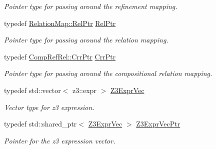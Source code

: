 \begin{DoxyCompactItemize}
\begin{DoxyCompactList}\small\item\em Pointer type for passing around the refinement mapping. \end{DoxyCompactList}\item 
\mbox{\label{namespaceilang_adca57fadf3c1f00dba124eb1ec56e6e9}} 
typedef \mbox{\hyperlink{classilang_1_1_relation_map_adfdefb173e77fc29073c233aa3ccdbd2}{Relation\+Map\+::\+Rel\+Ptr}} \mbox{\hyperlink{namespaceilang_adca57fadf3c1f00dba124eb1ec56e6e9}{Rel\+Ptr}}
\begin{DoxyCompactList}\small\item\em Pointer type for passing around the relation mapping. \end{DoxyCompactList}\item 
\mbox{\label{namespaceilang_a3c2c096b87ad7a9475c5a32315c18ba6}} 
typedef \mbox{\hyperlink{classilang_1_1_comp_ref_rel_a9081b437a14b3a2edef9d30b000ea535}{Comp\+Ref\+Rel\+::\+Crr\+Ptr}} \mbox{\hyperlink{namespaceilang_a3c2c096b87ad7a9475c5a32315c18ba6}{Crr\+Ptr}}
\begin{DoxyCompactList}\small\item\em Pointer type for passing around the compositional relation mapping. \end{DoxyCompactList}\item 
\mbox{\label{namespaceilang_adc4eee919aa24fff882d03a48d733c19}} 
typedef std\+::vector$<$ z3\+::expr $>$ \mbox{\hyperlink{namespaceilang_adc4eee919aa24fff882d03a48d733c19}{Z3\+Expr\+Vec}}
\begin{DoxyCompactList}\small\item\em Vector type for z3 expression. \end{DoxyCompactList}\item 
\mbox{\label{namespaceilang_aca9ddf66d424d9d9544db761963a5836}} 
typedef std\+::shared\+\_\+ptr$<$ \mbox{\hyperlink{namespaceilang_adc4eee919aa24fff882d03a48d733c19}{Z3\+Expr\+Vec}} $>$ \mbox{\hyperlink{namespaceilang_aca9ddf66d424d9d9544db761963a5836}{Z3\+Expr\+Vec\+Ptr}}
\begin{DoxyCompactList}\small\item\em Pointer for the z3 expression vector. \end{DoxyCompactList}\item 

\end{DoxyCompactItemize}
